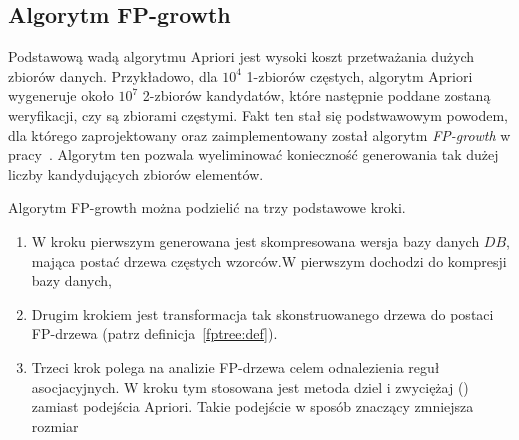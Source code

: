 



\subsection{Algorytm FP-growth}

Podstawową wadą algorytmu Apriori jest wysoki koszt przetważania dużych zbiorów danych. Przykładowo, dla $10^4$ 1-zbiorów częstych, algorytm Apriori wygeneruje około $10^7$ 2-zbiorów kandydatów, które następnie poddane zostaną weryfikacji, czy są zbiorami częstymi. Fakt ten stał się podstwawowym powodem, dla którego zaprojektowany oraz zaimplementowany został algorytm \emph{FP-growth} w pracy~\cite{Main:FPgrowth}. Algorytm ten pozwala wyeliminować konieczność generowania tak dużej liczby kandydujących zbiorów elementów. 

Algorytm FP-growth można podzielić na trzy podstawowe kroki.
\begin{enumerate}
	\item W kroku pierwszym generowana jest skompresowana wersja bazy danych $DB$, mająca postać drzewa częstych wzorców.W pierwszym dochodzi do kompresji bazy danych, 
	\item Drugim krokiem jest transformacja tak skonstruowanego drzewa do postaci FP-drzewa (patrz definicja~\ref{fptree:def}).
	\item Trzeci krok polega na analizie FP-drzewa celem odnalezienia reguł asocjacyjnych. W kroku tym stosowana jest metoda dziel i zwyciężaj () zamiast podejścia Apriori. Takie podejście w sposób znaczący zmniejsza rozmiar 
\end{enumerate}

